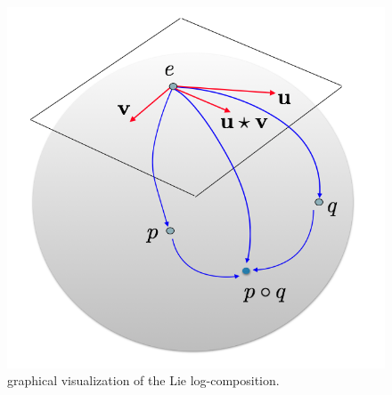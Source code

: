 \begin{figure}[!ht]
	\centering
	\includegraphics[scale=0.35]{figures/log_composition.png}
	\caption{graphical visualization of the Lie log-composition.}
	\label{fig:composition}
\end{figure}

